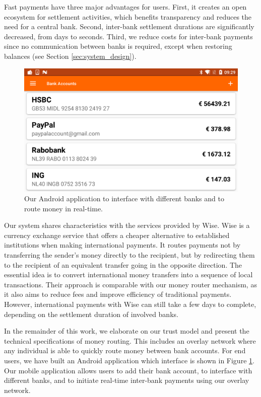 Fast payments have three major advantages for users.
First, it creates an open ecosystem for settlement activities, which benefits transparency and reduces the need for a central bank.
Second, inter-bank settlement durations are significantly decreased, from days to seconds. %
Third, we reduce costs for inter-bank payments since no communication between banks is required, except when restoring balances (see Section \ref{sec:system_design}).

\begin{figure}[!t]
	\centering
	\includegraphics[width=.8\linewidth]{iom/assets/android}
	\caption{Our Android application to interface with different banks and to route money in real-time.}
	\label{fig:android_app}
\end{figure}

Our system shares characteristics with the services provided by Wise.
Wise is a currency exchange service that offers a cheaper alternative to established institutions when making international payments.
It routes payments not by transferring the sender's money directly to the recipient, but by redirecting them to the recipient of an equivalent transfer going in the opposite direction.
The essential idea is to convert international money transfers into a sequence of local transactions.
Their approach is comparable with our money router mechanism, as it also aims to reduce fees and improve efficiency of traditional payments.
However, international payments with Wise can still take a few days to complete, depending on the settlement duration of involved banks.

In the remainder of this work, we elaborate on our trust model and present the technical specifications of money routing.
This includes an overlay network where any individual is able to quickly route money between bank accounts.
For end users, we have built an Android application which interface is shown in Figure \ref{fig:android_app}.
Our mobile application allows users to add their bank account, to interface with different banks, and to initiate real-time inter-bank payments using our overlay network.

